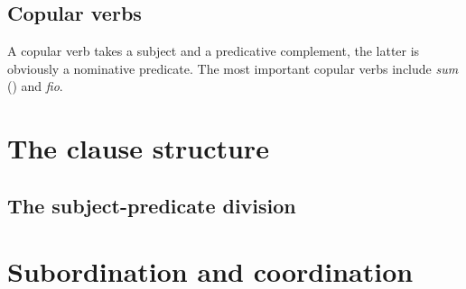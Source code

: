 \documentclass{article}
\newcommand*{\corpus}[1]{\emph{#1}}
\begin{document}
\subsection{Copular verbs}

A copular verb takes a subject and a predicative complement,
the latter is obviously a nominative predicate.
The most important copular verbs include \corpus{sum} () 
and \corpus{fio}.


\section{The clause structure}

\subsection{The subject-predicate division}\label{sec:subject-predicate}

\section{Subordination and coordination}




\end{document}

